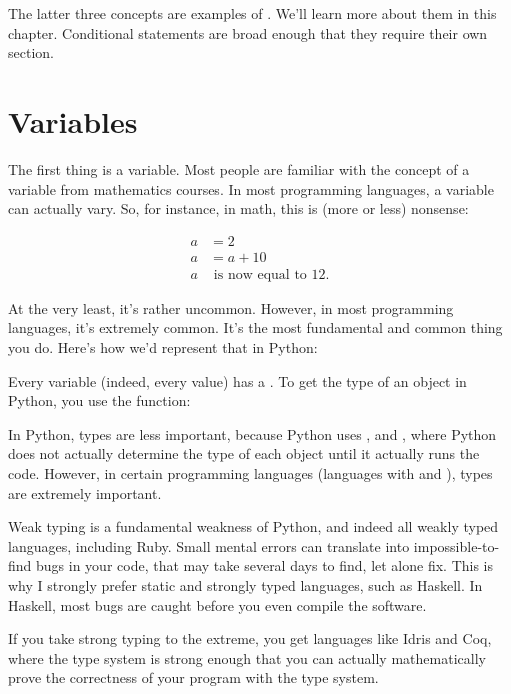 The latter three concepts are examples of . We'll learn more about them in this
chapter. Conditional statements are broad enough that they require
their own section.

\section{Variables}

The first thing is a variable. Most people are familiar with the
concept of a variable from mathematics courses. In most programming
languages, a variable can actually vary. So, for instance, in math,
this is (more or less) nonsense:

\begin{align*}
  a & = 2 \\
  a & = a + 10 \\
  a & \text{ is now equal to 12.}
\end{align*}

At the very least, it's rather uncommon. However, in most programming
languages, it's extremely common. It's the most fundamental and common
thing you do. Here's how we'd represent that in Python:


Every variable (indeed, every value) has a . To get the
type of an object in Python, you use the  function:


\begin{remark}
  In Python, types are less important, because Python uses , and , where Python does not actually
  determine the type of each object until it actually runs the
  code. However, in certain programming languages (languages with
   and ), types are extremely
  important.

  Weak typing is a fundamental weakness of Python, and indeed all
  weakly typed languages, including Ruby. Small mental errors can
  translate into impossible-to-find bugs in your code, that may take
  several days to find, let alone fix. This is why I strongly prefer
  static and strongly typed languages, such as Haskell. In Haskell,
  most bugs are caught before you even compile the software.

  If you take strong typing to the extreme, you get languages like
  Idris and Coq, where the type system is strong enough that you can
  actually mathematically prove the correctness of your program with
  the type system.
\end{remark}

